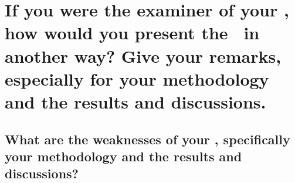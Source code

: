 \graytx{\blindtext}
			
	
	
	
	
\section*{\thesection\quad If you were the examiner of your \documentType, how would you present the \documentType \ in another way?  Give your remarks, especially for your methodology and the results and discussions.}

	
\graytx{\blindtext}
	
	
\subsection*{\thesubsection\quad What are the weaknesses of your \documentType, specifically  your methodology and the results and discussions?}

\graytx{\blindtext}
